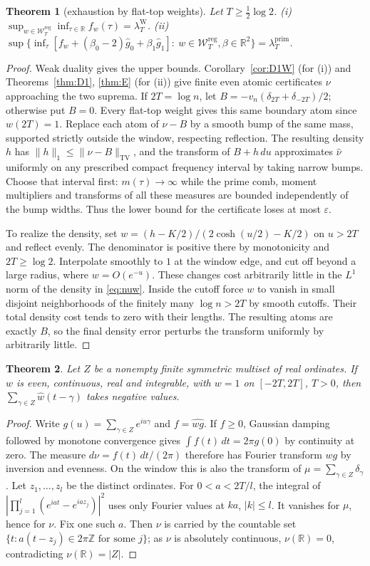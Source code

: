\documentclass[10pt]{amsart}
\newtheorem{theorem}{Theorem}[section]
\theoremstyle{definition}
\theoremstyle{remark}
\newcommand{\R}{\mathbb R}
\newcommand{\TV}{\operatorname{TV}}
\newcommand{\lamP}{\lambda^{\mathrm{prim}}_T}
\newcommand{\lamW}{\lambda^{\mathrm W}_T}
\newcommand{\gh}[1]{\widehat g_{#1}}
\newcommand{\Wcl}{\mathcal W_T}
\begin{document}
\begin{theorem}[exhaustion by flat-top weights]\label{thm:Zexh}
Let $T\ge\frac12\log2$. \emph{(i)} $\sup_{w\in\Wcl^{\mathrm{reg}}}\inf_{\tau\in\R}f_w(\tau)=\lamW$.
\emph{(ii)} $\sup\{\inf_\tau[f_w+(\beta_0-2)\gh0+\beta_1\gh1]:\ w\in\Wcl^{\mathrm{reg}},\beta\in\R^2\}=\lamP$.
\end{theorem}
\begin{proof}
Weak duality gives the upper bounds. Corollary~\ref{cor:D1W} (for (i)) and
Theorems~\ref{thm:D1}, \ref{thm:E} (for (ii)) give finite even atomic certificates $\nu$ approaching
the two suprema. If $2T=\log n$, let
$B=-v_n(\delta_{2T}+\delta_{-2T})/2$; otherwise put $B=0$.
Every flat-top weight gives this same boundary atom since $w(2T)=1$.
Replace each atom of $\nu-B$ by a smooth bump of the same mass,
supported strictly outside the window, respecting reflection. The
resulting density $h$ has $\|h\|_1\le\|\nu-B\|_{\TV}$, and the
transform of $B+h\,du$ approximates $\widehat\nu$ uniformly on
any prescribed compact frequency interval by taking narrow bumps.
Choose that interval first: $m(\tau)\to\infty$ while the prime comb,
moment multipliers and transforms of all these measures are bounded
independently of the bump widths. Thus the lower bound for the
certificate loses at most $\varepsilon$.

To realize the density, set $w=(h-K/2)/(2\cosh(u/2)-K/2)$ on
$u>2T$ and reflect evenly. The denominator is positive there by
monotonicity and $2T\ge\log2$. Interpolate smoothly to $1$ at the
window edge, and cut off beyond a large radius, where $w=O(e^{-u})$.
These changes cost arbitrarily little in the $L^1$ norm of the density
in \eqref{eq:nuw}. Inside the cutoff force $w$ to vanish in small
disjoint neighborhoods of the finitely many $\log n>2T$ by smooth
cutoffs. Their total density cost tends to zero with their lengths.
The resulting atoms are exactly $B$, so the final density error
perturbs the transform uniformly by arbitrarily little.
\end{proof}

\begin{theorem}\label{thm:finZ}
Let $Z$ be a nonempty finite symmetric multiset of real ordinates.
If $w$ is even, continuous, real and integrable, with $w=1$ on
$[-2T,2T]$, $T>0$, then $\sum_{\gamma\in Z}\widehat w(t-\gamma)$
takes negative values.
\end{theorem}
\begin{proof}
Write $g(u)=\sum_{\gamma\in Z}e^{iu\gamma}$ and $f=\widehat{wg}$.
If $f\ge0$, Gaussian damping followed by monotone convergence gives
$\int f(t)\,dt=2\pi g(0)$ by continuity at zero. The measure
$d\nu=f(t)\,dt/(2\pi)$ therefore has Fourier transform $wg$ by
inversion and evenness. On the window this is also the transform
of $\mu=\sum_{\gamma\in Z}\delta_\gamma$.
Let $z_1,\ldots,z_l$ be the distinct ordinates. For $0<a<2T/l$,
the integral of $|\prod_{j=1}^l(e^{iat}-e^{iaz_j})|^2$ uses only
Fourier values at $ka$, $|k|\le l$. It vanishes for $\mu$, hence
for $\nu$. Fix one such $a$. Then $\nu$ is carried by the countable set
$\{t:a(t-z_j)\in2\pi\mathbb Z\text{ for some }j\}$; as $\nu$ is absolutely
continuous, $\nu(\mathbb R)=0$, contradicting $\nu(\mathbb R)=|Z|$.
\end{proof}
\end{document}
